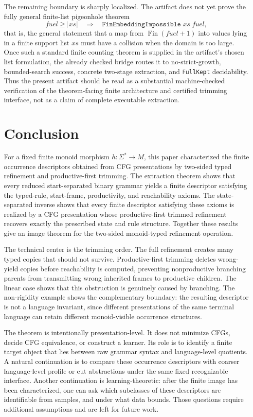\documentclass[sub]{jalc}
\begin{document}
The remaining boundary is sharply localized.  The artifact does not yet prove
the fully general finite-list pigeonhole theorem
\[
 fuel\ge |xs| \quad\Longrightarrow\quad
 \texttt{FinEmbeddingImpossible } xs\; fuel,
\]
that is, the general statement that a map from
\(\operatorname{Fin}(fuel+1)\) into values lying in a finite support list
\(xs\) must have a collision when the domain is too large.  Once such a
standard finite counting theorem is supplied in the artifact's chosen list
formulation, the already checked bridge routes it to no-strict-growth,
bounded-search success, concrete two-stage extraction, and \texttt{FullKept}
decidability.  Thus the present artifact should be read as a substantial
machine-checked verification of the theorem-facing finite architecture and
certified trimming interface, not as a claim of complete executable extraction.

\section{Conclusion}
\label{sec:conclusion-open-problems}

For a fixed finite monoid morphism \(h:\Sigma^*\to M\), this paper characterized
the finite occurrence descriptors obtained from CFG presentations by two-sided
typed refinement and productive-first trimming.  The extraction theorem shows
that every reduced start-separated binary grammar yields a finite descriptor
satisfying the typed-rule, start-frame, productivity, and reachability axioms.
The state-separated inverse shows that every finite descriptor satisfying these
axioms is realized by a CFG presentation whose productive-first trimmed
refinement recovers exactly the prescribed state and rule structure.  Together
these results give an image theorem for the two-sided monoid-typed refinement
operation.

The technical center is the trimming order.  The full refinement creates many
typed copies that should not survive.  Productive-first trimming deletes
wrong-yield copies before reachability is computed, preventing nonproductive
branching parents from transmitting wrong inherited frames to productive
children.  The linear case shows that this obstruction is genuinely caused by
branching.  The non-rigidity example shows the complementary boundary: the
resulting descriptor is not a language invariant, since different presentations
of the same terminal language can retain different monoid-visible occurrence
structures.

The theorem is intentionally presentation-level.  It does not minimize CFGs,
decide CFG equivalence, or construct a learner.  Its role is to identify a
finite target object that lies between raw grammar syntax and language-level
quotients.  A natural continuation is to compare these occurrence descriptors
with coarser language-level profile or cut abstractions under the same fixed
recognizable interface.  Another continuation is learning-theoretic: after the
finite image has been characterized, one can ask which subclasses of these
descriptors are identifiable from samples, and under what data bounds.  Those
questions require additional assumptions and are left for future work.



\end{document}

